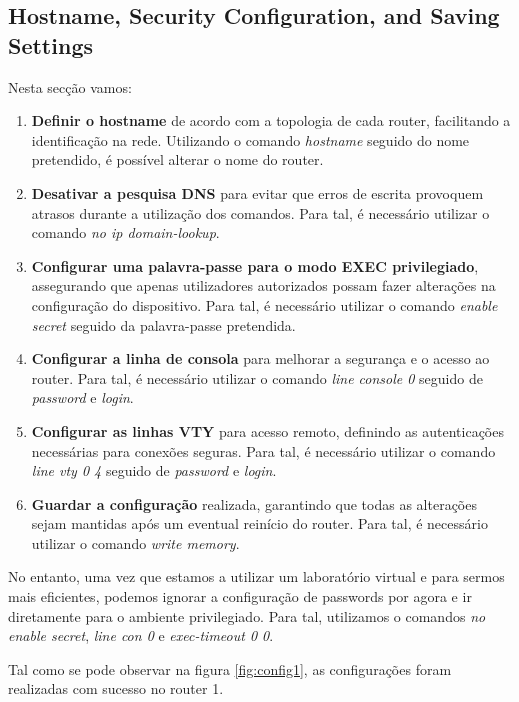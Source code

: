 \documentclass[11pt,english, openright, oneside]{book}
\begin{document}
\subsection{Hostname, Security Configuration, and Saving Settings}
\vspace{0.2cm}

Nesta secção vamos:

\begin{enumerate}
  \item \textbf{Definir o hostname} de acordo com a topologia de cada router, facilitando a identificação na rede. Utilizando o comando \textit{hostname} seguido do nome pretendido, é possível alterar o nome do router.
  \item \textbf{Desativar a pesquisa DNS} para evitar que erros de escrita provoquem atrasos durante a utilização dos comandos. Para tal, é necessário utilizar o comando \textit{no ip domain-lookup}.
  \item \textbf{Configurar uma palavra-passe para o modo EXEC privilegiado}, assegurando que apenas utilizadores autorizados possam fazer alterações na configuração do dispositivo. Para tal, é necessário utilizar o comando \textit{enable secret} seguido da palavra-passe pretendida.
  \item \textbf{Configurar a linha de consola} para melhorar a segurança e o acesso ao router. Para tal, é necessário utilizar o comando \textit{line console 0} seguido de \textit{password} e \textit{login}.
  \item \textbf{Configurar as linhas VTY} para acesso remoto, definindo as autenticações necessárias para conexões seguras. Para tal, é necessário utilizar o comando \textit{line vty 0 4} seguido de \textit{password} e \textit{login}.
  \item \textbf{Guardar a configuração} realizada, garantindo que todas as alterações sejam mantidas após um eventual reinício do router. Para tal, é necessário utilizar o comando \textit{write memory}.
\end{enumerate}
\vspace{0.2cm}

No entanto, uma vez que estamos a utilizar um laboratório virtual e para sermos mais eficientes, podemos ignorar a configuração de passwords por agora e ir diretamente para o ambiente privilegiado. Para tal, utilizamos o comandos \textit{no enable secret}, \textit{line con 0} e \textit{exec-timeout 0 0}.

\vspace{0.2cm}
Tal como se pode observar na figura \ref{fig:config1}, as configurações foram realizadas com sucesso no router 1.
\vspace{0.2cm}
\end{document}
